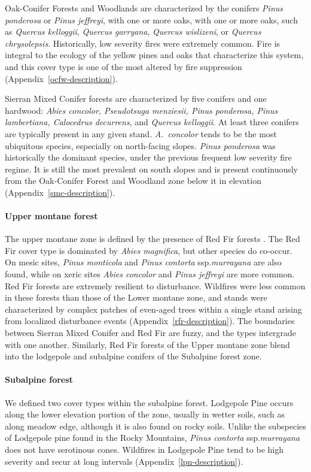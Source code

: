 Oak-Conifer Forests and Woodlands are characterized by the conifers \emph{Pinus ponderosa} or \emph{Pinus jeffreyi}, with one or more oaks, with one or more oaks, such as \emph{Quercus kelloggii}, \emph{Quercus garryana}, \emph{Quercus wislizeni}, or \emph{Quercus chrysolepsis}. Historically, low severity fires were extremely common. Fire is integral to the ecology of the yellow pines and oaks that characterize this system, and this cover type is one of the most altered by fire suppression (Appendix~\ref{ocfw-description}).

Sierran Mixed Conifer forests are characterized by five conifers and one hardwood: \emph{Abies concolor, Pseudotsuga menziesii, Pinus ponderosa, Pinus lambertiana, Calocedrus decurrens}, and \emph{Quercus kelloggii}. At least three conifers are typically present in any given stand. \emph{A.~concolor} tends to be the most ubiquitous species, especially on north-facing slopes. \emph{Pinus ponderosa} was historically the dominant species, under the previous frequent low severity fire regime. It is still the most prevalent on south slopes and is present continuously from the Oak-Conifer Forest and Woodland zone below it in elevation (Appendix~\ref{smc-description}).


\paragraph{Upper montane forest} The upper montane zone is defined by the presence of Red Fir forests \citep{Potter1998}. The Red Fir cover type is dominated by \emph{Abies magnifica}, but other species do co-occur. On mesic sites, \emph{Pinus monticola} and \emph{Pinus contorta} ssp.\@ \emph{murrayana} are also found, while on xeric sites \emph{Abies concolor} and \emph{Pinus jeffreyi} are more common. Red Fir forests are extremely resilient to disturbance. Wildfires were less common in these forests than those of the Lower montane zone, and stands were characterized by complex patches of even-aged trees within a single stand arising from localized disturbance events (Appendix~\ref{rfr-description}). The boundaries between Sierran Mixed Conifer and Red Fir are fuzzy, and the types intergrade with one another. Similarly, Red Fir forests of the Upper montane zone blend into the lodgepole and subalpine conifers of the Subalpine forest zone.


\paragraph{Subalpine forest} We defined two cover types within the subalpine forest. Lodgepole Pine occurs along the lower elevation portion of the zone, usually in wetter soils, such as along meadow edge, although it is also found on rocky soils. Unlike the subspecies of Lodgepole pine found in the Rocky Mountains, \emph{Pinus contorta} ssp.\@ \emph{murrayana} does not have serotinous cones. Wildfires in Lodgepole Pine tend to be high severity and recur at long intervals (Appendix~\ref{lpn-description}).%

